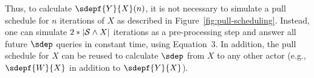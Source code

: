












Thus, to calculate $\sdepf{Y}{X}(n)$, it is not necessary to simulate
a pull schedule for $n$ iterations of $X$ as described in
Figure~\ref{fig:pull-scheduling}.  Instead, one can simulate $2 *
|{\cal S} \wedge X|$ iterations as a pre-processing step and answer
all future $\sdep$ queries in constant time, using Equation~3.  In
addition, the pull schedule for $X$ can be reused to calculate $\sdep$
from $X$ to any other actor (e.g., $\sdepf{W}{X}$ in addition to
$\sdepf{Y}{X}$).

